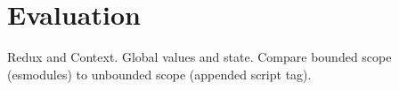 \chapter{Evaluation}

Redux and Context. Global values and state. Compare bounded scope (esmodules) to unbounded scope (appended script tag).
